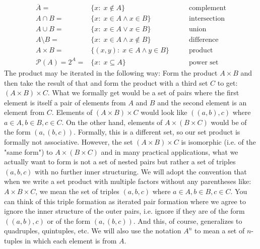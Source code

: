 \begin{eqnarray}
 \overline{A}  =& \{x: \; x \notin A \}                    \qquad &\text{complement} \\	
 A \cap B      =& \{x: \; x \in A \wedge x \in    B \}     \qquad &\text{intersection} \\
 A \cup B      =& \{x: \; x \in A \vee   x \in    B \}     \qquad &\text{union} \\
 A \setminus B =& \{x: \; x \in A \wedge x \notin B \}     \qquad &\text{difference} \\
 A \times B    =& \{(x,y): \; x \in A \wedge y \in    B \} \qquad &\text{product} \\
 \mathcal{P}(A) 
        = 2^A = &  \{x : \; x \subseteq A \}               \qquad &\text{power set}
\end{eqnarray}
The product may be iterated in the following way: Form the product $A \times B$ and then take the result of that and form the product with a third set $C$ to get: $(A \times B) \times C$. What we formally get would be a set of pairs where the first element is itself a pair of elements from $A$ and $B$ and the second element is an element from $C$. Elements of $(A \times B) \times C$ would look like $((a,b),c)$ where $a \in A, b \in B, c \in C$. On the other hand, elements of $A \times (B \times C)$ would be of the form $(a, (b,c))$. Formally, this is a different set, so our set product is formally not associative. However, the set $(A \times B) \times C$ is isomorphic (i.e. of the "same form") to $A \times (B \times C)$ and in many practical applications, what we actually want to form is not a set of nested pairs but rather a set of triples $(a,b,c)$ with no further inner structuring. We will adopt the convention that when we write a set product with multiple factors without any parentheses like: $A \times B \times C$, we mean the set of triples $(a,b,c)$ where $a \in A, b \in B, c \in C$. You can think of this triple formation as iterated pair formation where we agree to ignore the inner structure of the outer pairs, i.e. ignore if they are of the form $((a,b),c)$ or of the form $(a, (b,c))$. And this, of course, generalizes to quadruples, quintuples, etc. We will also use the notation $A^n$ to mean a set of $n$-tuples in which each element is from $A$. 



